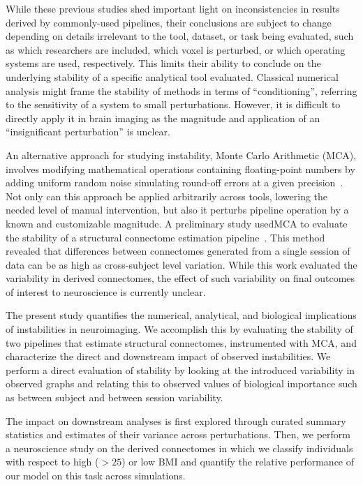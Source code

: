 \documentclass[fleqn,10pt]{SelfArx} %
\begin{document}
While these previous studies shed important light on inconsistencies in results derived by commonly-used pipelines,
their conclusions are subject to change depending on details irrelevant to the tool, dataset, or task being evaluated,
such as which researchers are included, which voxel is perturbed, or which operating systems are used, respectively.
This limits their ability to conclude on the underlying stability of a specific analytical tool evaluated. Classical
numerical analysis might frame the stability of methods in terms of ``conditioning'',  referring to the sensitivity of
a system to small perturbations. However, it is difficult to directly apply it in brain imaging as the magnitude and
application of an ``insignificant perturbation'' is unclear.

An alternative approach for studying instability, Monte Carlo Arithmetic (MCA), involves modifying  mathematical
operations containing floating-point numbers by adding uniform random noise simulating round-off errors at a given
precision~\cite{Parker1997-qq}. Not only can this approach be applied arbitrarily across tools, lowering the needed
level of manual intervention, but also it perturbs pipeline operation by a known and customizable magnitude. A
preliminary study usedMCA to evaluate the stability of a structural connectome estimation pipeline~\cite{Kiar2020-lb}.
This method revealed that differences between connectomes generated from a single session of data can be as high as
cross-subject level variation. While this work evaluated the variability in derived connectomes, the effect of such
variability on final outcomes of interest to neuroscience is currently unclear.

The present study quantifies the numerical, analytical, and biological implications of instabilities in neuroimaging.
We accomplish this by evaluating the stability of two pipelines that estimate structural connectomes, instrumented with
MCA, and characterize the direct and downstream impact of observed instabilities. We perform a direct evaluation of
stability by looking at the introduced variability in observed graphs and relating this to observed values of
biological importance such as between subject and between session variability.

The impact on downstream analyses is first explored through curated summary statistics and estimates of their variance
across perturbations. Then, we perform a neuroscience study on the derived connectomes in which we classify individuals
with respect to high ($>25$) or low BMI and quantify the relative performance of our model on this task across
simulations.
\end{document}
